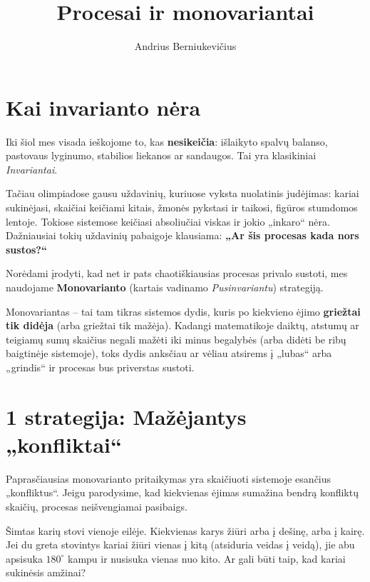 \documentclass[11pt,a4paper]{scrartcl}
\title{Procesai ir monovariantai}
\author{Andrius Berniukevičius}
\begin{document}
\maketitle

\section{Kai invarianto nėra}

Iki šiol mes visada ieškojome to, kas \textbf{nesikeičia}: išlaikyto spalvų balanso, pastovaus lyginumo, stabilios liekanos ar sandaugos. Tai yra klasikiniai \textit{Invariantai}.

Tačiau olimpiadose gausu uždavinių, kuriuose vyksta nuolatinis judėjimas: kariai sukinėjasi, skaičiai keičiami kitais, žmonės pykstasi ir taikosi, figūros stumdomos lentoje. Tokiose sistemose keičiasi absoliučiai viskas ir jokio „inkaro“ nėra. Dažniausiai tokių uždavinių pabaigoje klausiama: \textbf{„Ar šis procesas kada nors sustos?“}

Norėdami įrodyti, kad net ir pats chaotiškiausias procesas privalo sustoti, mes naudojame \textbf{Monovarianto} (kartais vadinamo \textit{Pusinvariantu}) strategiją. 

Monovariantas – tai tam tikras sistemos dydis, kuris po kiekvieno ėjimo \textbf{griežtai tik didėja} (arba griežtai tik mažėja). Kadangi matematikoje daiktų, atstumų ar teigiamų sumų skaičius negali mažėti iki minus begalybės (arba didėti be ribų baigtinėje sistemoje), toks dydis anksčiau ar vėliau atsirems į „lubas“ arba „grindis“ ir procesas bus priverstas sustoti.

\section{1 strategija: Mažėjantys „konfliktai“}

Paprasčiausias monovarianto pritaikymas yra skaičiuoti sistemoje esančius „konfliktus“. Jeigu parodysime, kad kiekvienas ėjimas sumažina bendrą konfliktų skaičių, procesas neišvengiamai pasibaigs.

\begin{example}
Šimtas karių stovi vienoje eilėje. Kiekvienas karys žiūri arba į dešinę, arba į kairę. Jei du greta stovintys kariai žiūri vienas į kitą (atsiduria veidas į veidą), jie abu apsisuka $180^\circ$ kampu ir nusisuka vienas nuo kito. Ar gali būti taip, kad kariai sukinėsis amžinai?
\end{example}
\end{document}
